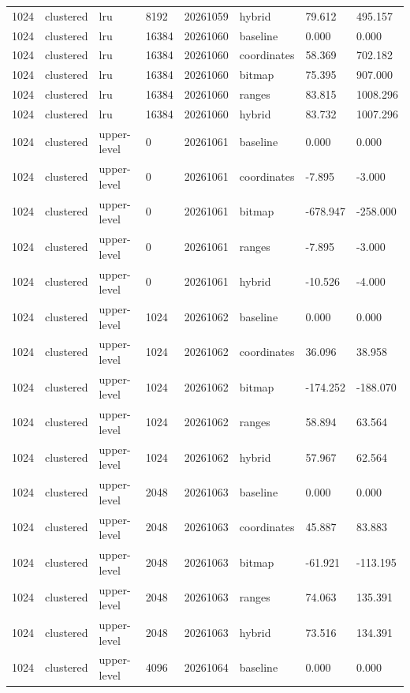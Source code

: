 \begin{tabular}{llllllll}
1024 & clustered & lru & 8192 & 20261059 & hybrid & 79.612 & 495.157 \\
1024 & clustered & lru & 16384 & 20261060 & baseline & 0.000 & 0.000 \\
1024 & clustered & lru & 16384 & 20261060 & coordinates & 58.369 & 702.182 \\
1024 & clustered & lru & 16384 & 20261060 & bitmap & 75.395 & 907.000 \\
1024 & clustered & lru & 16384 & 20261060 & ranges & 83.815 & 1008.296 \\
1024 & clustered & lru & 16384 & 20261060 & hybrid & 83.732 & 1007.296 \\
1024 & clustered & upper-level & 0 & 20261061 & baseline & 0.000 & 0.000 \\
1024 & clustered & upper-level & 0 & 20261061 & coordinates & -7.895 & -3.000 \\
1024 & clustered & upper-level & 0 & 20261061 & bitmap & -678.947 & -258.000 \\
1024 & clustered & upper-level & 0 & 20261061 & ranges & -7.895 & -3.000 \\
1024 & clustered & upper-level & 0 & 20261061 & hybrid & -10.526 & -4.000 \\
1024 & clustered & upper-level & 1024 & 20261062 & baseline & 0.000 & 0.000 \\
1024 & clustered & upper-level & 1024 & 20261062 & coordinates & 36.096 & 38.958 \\
1024 & clustered & upper-level & 1024 & 20261062 & bitmap & -174.252 & -188.070 \\
1024 & clustered & upper-level & 1024 & 20261062 & ranges & 58.894 & 63.564 \\
1024 & clustered & upper-level & 1024 & 20261062 & hybrid & 57.967 & 62.564 \\
1024 & clustered & upper-level & 2048 & 20261063 & baseline & 0.000 & 0.000 \\
1024 & clustered & upper-level & 2048 & 20261063 & coordinates & 45.887 & 83.883 \\
1024 & clustered & upper-level & 2048 & 20261063 & bitmap & -61.921 & -113.195 \\
1024 & clustered & upper-level & 2048 & 20261063 & ranges & 74.063 & 135.391 \\
1024 & clustered & upper-level & 2048 & 20261063 & hybrid & 73.516 & 134.391 \\
1024 & clustered & upper-level & 4096 & 20261064 & baseline & 0.000 & 0.000 \\

\end{tabular}
